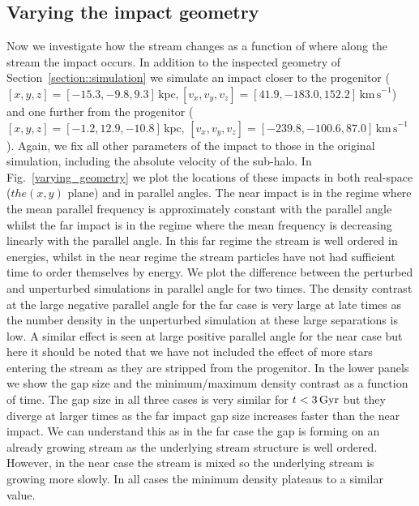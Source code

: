 \documentclass[useAMS,usenatbib,fleqn,a4paper]{mn2e}
\def\Gyr{\,{\rm Gyr}}
\begin{document}
\subsection{Varying the impact geometry}
Now we investigate how the stream changes as a function of where along the stream the impact occurs. In addition to the inspected geometry of Section~\ref{section::simulation} we simulate an impact closer to the progenitor ($[x,y,z]=[-15.3,-9.8,9.3]\,\mathrm{kpc},[v_x,v_y,v_z]=[41.9,-183.0,152.2]\,\mathrm{km\,s}^{-1}$) and one further from the progenitor ($[x,y,z]=[-1.2,12.9,-10.8]\,\mathrm{kpc},\,[v_x,v_y,v_z]=[-239.8,-100.6,87.0]\,\mathrm{km\,s}^{-1}$). Again, we fix all other parameters of the impact to those in the original simulation, including the absolute velocity of the sub-halo. In Fig.~\ref{varying_geometry} we plot the locations of these impacts in both real-space ($ the (x,y)$ plane) and in parallel angles. The near impact is in the regime where the mean parallel frequency is approximately constant with the parallel angle whilst the far impact is in the regime where the mean frequency is decreasing linearly with the parallel angle. In this far regime the stream is well ordered in energies, whilst in the near regime the stream particles have not had sufficient time to order themselves by energy. We plot the difference between the perturbed and unperturbed simulations in parallel angle for two times. The density contrast at the large negative parallel angle for the far case is very large at late times as the number density in the unperturbed simulation at these large separations is low. A similar effect is seen at large positive parallel angle for the near case but here it should be noted that we have not included the effect of more stars entering the stream as they are stripped from the progenitor. In the lower panels we show the gap size and the minimum/maximum density contrast as a function of time. The gap size in all three cases is very similar for $t<3\Gyr$ but they diverge at larger times as the far impact gap size increases faster than the near impact. We can understand this as in the far case the gap is forming on an already growing stream as the underlying stream structure is well ordered. However, in the near case the stream is mixed so the underlying stream is growing more slowly. In all cases the minimum density plateaus to a similar value.
\end{document}
